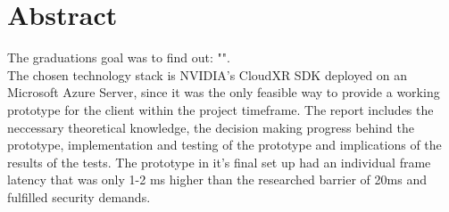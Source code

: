 
\section{Abstract}

The graduations goal was to find out: "\textit{}". \\

The chosen technology stack is NVIDIA's CloudXR SDK deployed on an Microsoft Azure Server, since it was the only feasible way to provide a working prototype for the client within the project timeframe. The report includes the neccessary theoretical knowledge, the decision making progress behind the prototype, implementation and testing of the prototype and implications of the results of the tests. The prototype in it's final set up had an individual frame latency that was only 1-2 \acrshort{ms} higher than the researched barrier of 20\acrshort{ms} and fulfilled security demands.

